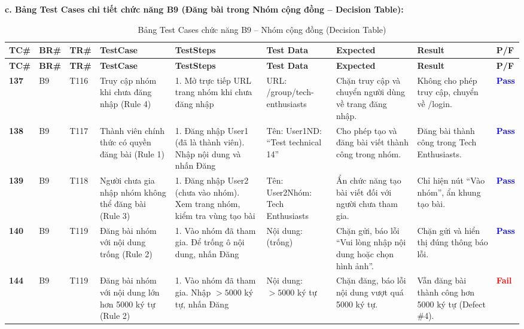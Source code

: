 \documentclass[11pt,a4paper]{article}
\begin{document}
\noindent\textbf{c. Bảng Test Cases chi tiết chức năng B9 (Đăng bài trong Nhóm cộng đồng -- Decision Table):}
\begingroup
\scriptsize
\setlength{\tabcolsep}{3pt}
\renewcommand{\arraystretch}{0.92}
\begin{longtable}{|C{0.8cm}|C{0.85cm}|C{0.95cm}|L{2.0cm}|L{3.0cm}|L{2.15cm}|L{2.6cm}|L{2.5cm}|C{0.85cm}|}
\hline
{}
\textbf{TC\#} & \textbf{BR\#} & \textbf{TR\#} & \textbf{TestCase} & \textbf{TestSteps} & \textbf{Test Data} & \textbf{Expected} & \textbf{Result} & \textbf{P/F} \tabularnewline
\hline
\endfirsthead
\hline
{}
\textbf{TC\#} & \textbf{BR\#} & \textbf{TR\#} & \textbf{TestCase} & \textbf{TestSteps} & \textbf{Test Data} & \textbf{Expected} & \textbf{Result} & \textbf{P/F} \tabularnewline
\hline
\endhead
\hline
\endfoot
\hline
\caption{Bảng Test Cases chức năng B9 -- Nhóm cộng đồng (Decision Table)}
\endlastfoot
\textbf{137} & B9 & T116 & Truy cập nhóm khi chưa đăng nhập (Rule 4) & 1. Mở trực tiếp URL trang nhóm khi chưa đăng nhập & URL: /group/tech-enthusiasts & Chặn truy cập và chuyển người dùng về trang đăng nhập. & Không cho phép truy cập, chuyển về /login. & \textcolor{blue}{\textbf{Pass}} \\ \hline
\textbf{138} & B9 & T117 & Thành viên chính thức có quyền đăng bài (Rule 1) & 1. Đăng nhập User1 (đã là thành viên). Nhập nội dung và nhấn Đăng & Tên: User1\newline ND: ``Test technical 14'' & Cho phép tạo và đăng bài viết thành công trong nhóm. & Đăng bài thành công trong Tech Enthusiasts. & \textcolor{blue}{\textbf{Pass}} \\ \hline
\textbf{139} & B9 & T118 & Người chưa gia nhập nhóm không thể đăng bài (Rule 3) & 1. Đăng nhập User2 (chưa vào nhóm). Xem trang nhóm, kiểm tra vùng tạo bài & Tên: User2\newline Nhóm: Tech Enthusiasts & Ẩn chức năng tạo bài viết đối với người chưa tham gia. & Chỉ hiện nút ``Vào nhóm'', ẩn khung tạo bài. & \textcolor{blue}{\textbf{Pass}} \\ \hline
\textbf{140} & B9 & T119 & Đăng bài nhóm với nội dung trống (Rule 2) & 1. Vào nhóm đã tham gia. Để trống ô nội dung, nhấn Đăng & Nội dung: (trống) & Chặn gửi, báo lỗi ``Vui lòng nhập nội dung hoặc chọn hình ảnh''. & Chặn gửi và hiển thị đúng thông báo lỗi. & \textcolor{blue}{\textbf{Pass}} \\ \hline
\textbf{144} & B9 & T119 & Đăng bài nhóm với nội dung lớn hơn 5000 ký tự (Rule 2) & 1. Vào nhóm đã tham gia. Nhập $> 5000$ ký tự, nhấn Đăng & Nội dung: $> 5000$ ký tự & Chặn đăng, báo lỗi nội dung vượt quá 5000 ký tự. & Vẫn đăng bài thành công hơn 5000 ký tự (Defect \#4). & \textcolor{red}{\textbf{Fail}} \\ \hline
\end{longtable}
\endgroup
\end{document}
